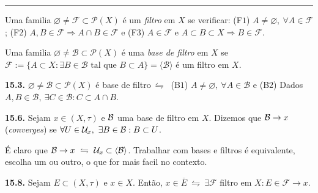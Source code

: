 \-
\hrule

\begin{definition}
    Uma familia \(\varnothing \neq \mathcal{F}\subset \mathcal{P}(X)\) é um \emph{filtro} em \(X\) se verificar: (F$1$)  \(A \neq \varnothing, \ \forall A \in \mathcal{F}\); (F$2$)  \(A, B \in \mathcal{F} \Rightarrow A\cap B \in \mathcal{F}\) e (F$3$) \(A \in \mathcal{F}\) e \(A \subset B \subset X \Rightarrow B \in \mathcal{F}\).
\end{definition}

\begin{definition}
    Uma familia \(\varnothing \neq \mathcal{B} \subset \mathcal{P}(X)\) é uma \emph{base de filtro} em \(X\) se \(\mathcal{F}:= \{A \subset X : \exists B \in \mathcal{B} \text{ tal que } B \subset A\} = \langle \mathcal{B}\rangle\) é um filtro em \(X\). 
\end{definition}

\begin{proposition}
    \textbf{15.3.} \(\varnothing \neq \mathcal{B}\subset \mathcal{P}(X)\) é base de filtro\(\ \leftrightharpoons \ \) (B$1$) \(A \neq \varnothing, \ \forall A \in \mathcal{B}\) e (B$2$) Dados \(A,B \in \mathcal{B}, \ \exists C \in \mathcal{B} : C \subset A \cap B\).   
\end{proposition}


\begin{definition}
    \textbf{15.6.} Sejam \(x \in (X, \tau)\) e \(\mathcal{B}\) uma base de filtro em \(X\). Dizemos que \(\mathcal{B} \to x\) (\emph{converges}) se \(\forall U \in \mathcal{U}_x,\  \exists B \in \mathcal{B} : B \subset U\). 
\end{definition}

\begin{note}
    É claro que \(\mathcal{B} \to x \ \leftrightharpoons \ \mathcal{U}_x \subset \langle \mathcal{B} \rangle\). Trabalhar com bases e filtros é equivalente, escolha um ou outro, o que for mais facil no contexto.  
\end{note}

\begin{proposition}
    \textbf{15.8.} Sejam \(E \subset (X,\tau)\) e \(x \in X\). Então, \(x \in \overline{E} \ \leftrightharpoons \ \exists \mathcal{F} \) filtro em \(X : E \in \mathcal{F} \to x\).  
\end{proposition}

